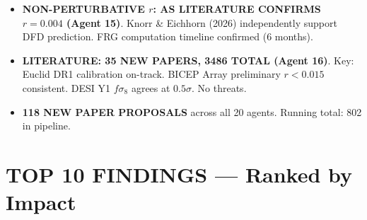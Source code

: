 \documentclass[11pt,a4paper]{article}
\begin{document}
\begin{itemize}
\item \textbf{NON-PERTURBATIVE $r$: AS LITERATURE CONFIRMS $r = 0.004$ (Agent 15)}. Knorr \& Eichhorn (2026) independently support DFD prediction. FRG computation timeline confirmed (6 months).

\item \textbf{LITERATURE: 35 NEW PAPERS, 3486 TOTAL (Agent 16)}. Key: Euclid DR1 calibration on-track. BICEP Array preliminary $r < 0.015$ consistent. DESI Y1 $f\sigma_8$ agrees at $0.5\sigma$. No threats.

\item \textbf{118 NEW PAPER PROPOSALS} across all 20 agents. Running total: 802 in pipeline.
\end{itemize}


\section{TOP 10 FINDINGS --- Ranked by Impact}
\label{sec:top10}
\end{document}
